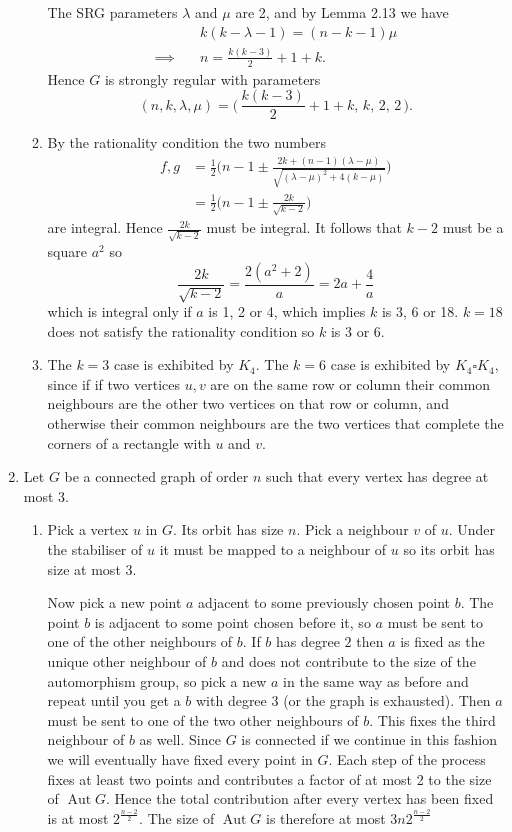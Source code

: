 \documentclass[a4paper, 12pt]{article}
\DeclareMathOperator{\aut}{Aut}
\begin{document}
\begin{enumerate}
\begin{enumerate}
The SRG parameters \(\lambda\) and \(\mu\) are 2, and by Lemma 2.13 we have
\begin{align*}
&k(k-\lambda-1)=(n-k-1)\mu\\
\implies\quad&n=\frac{k(k-3)}2+1+k.
\end{align*}
Hence \(G\) is strongly regular with parameters
\[(n,k,\lambda,\mu)=\bigg(\,\frac{k(k-3)}2+1+k,\,k,\,2,\,2\,\bigg).\]

\item By the rationality condition the two numbers
\begin{align*}
f,g&=\frac12\bigg(n-1\pm\frac{2k+(n-1)(\lambda-\mu)}{\sqrt{(\lambda-\mu)^2+4(k-\mu)}}\bigg)\\
&=\frac12\bigg(n-1\pm\frac{2k}{\sqrt{k-2}}\bigg)
\end{align*}
are integral. Hence \(\frac{2k}{\sqrt{k-2}}\) must be integral. It follows that \(k-2\) must be a square \(a^2\) so
\[\frac{2k}{\sqrt{k-2}}=\frac{2(a^2+2)}{a}=2a+\frac4a\]
which is integral only if \(a\) is 1, 2 or 4, which implies \(k\) is 3, 6 or 18. \(k=18\) does not satisfy the rationality condition so \(k\) is 3 or 6.

\item The \(k=3\) case is exhibited by \(K_4\). The \(k=6\) case is exhibited by \(K_4\square K_4\), since if if two vertices \(u,v\) are on the same row or column their common neighbours are the other two vertices on that row or column, and otherwise their common neighbours are the two vertices that complete the corners of a rectangle with \(u\) and \(v\).

\end{enumerate}

\item Let \(G\) be a connected graph of order \(n\) such that every vertex has degree at most 3.

\begin{enumerate}

\item Pick a vertex \(u\) in \(G\). Its orbit has size \(n\). Pick a neighbour \(v\) of \(u\). Under the stabiliser of \(u\) it must be mapped to a neighbour of \(u\) so its orbit has size at most 3.

Now pick a new point \(a\) adjacent to some previously chosen point \(b\). The point \(b\) is adjacent to some point chosen before it, so \(a\) must be sent to one of the other neighbours of \(b\). If \(b\) has degree \(2\) then \(a\) is fixed as the unique other neighbour of \(b\) and does not contribute to the size of the automorphism group, so pick a new \(a\) in the same way as before and repeat until you get a \(b\) with degree \(3\) (or the graph is exhausted). Then \(a\) must be sent to one of the two other neighbours of \(b\). This fixes the third neighbour of \(b\) as well. Since \(G\) is connected if we continue in this fashion we will eventually have fixed every point in \(G\). Each step of the process fixes at least two points and contributes a factor of at most 2 to the size of \(\aut G\). Hence the total contribution after every vertex has been fixed is at most \(2^{\frac{n-2}2}\). The size of \(\aut G\) is therefore at most \(3n2^{\frac{n-2}2}\)


\end{enumerate}
\end{enumerate}
\end{document}
